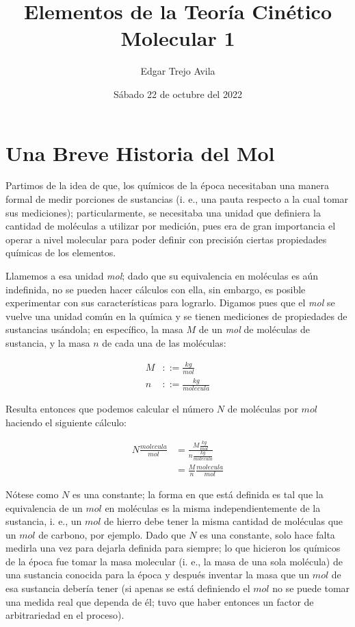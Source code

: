 \documentclass{article}
\title{Elementos de la Teoría Cinético Molecular 1}
\author{Edgar Trejo Avila}
\date{Sábado 22 de octubre del 2022}
\begin{document}
\maketitle

\section*{Una Breve Historia del Mol}

Partimos de la idea de que, los químicos de la época
necesitaban una manera formal de medir porciones de sustancias
(i. e., una pauta respecto a la cual tomar sus mediciones);
particularmente, se necesitaba una unidad que definiera
la cantidad de moléculas a utilizar por medición, pues era 
de gran importancia el operar a nivel molecular para poder 
definir con precisión ciertas propiedades químicas de los elementos.

Llamemos a esa unidad \textit{mol}; dado que su equivalencia
en moléculas es aún indefinida, no se pueden hacer cálculos con
ella, sin embargo, es posible experimentar con sus características
para lograrlo. Digamos pues que el \textit{mol} se vuelve una
unidad común en la química y se tienen mediciones de propiedades
de sustancias usándola; en específico, la masa \(M\) de un \textit{mol}
de moléculas de sustancia, y la masa \(n\) de cada una de las moléculas:

\begin{align*}
    M &::= \frac{kg}{mol}\\
    n &::= \frac{kg}{molecula}
\end{align*}

Resulta entonces que podemos calcular el número \(N\) de moléculas por
\(mol\) haciendo el siguiente cálculo:

\begin{align*}
    N \frac{molecula}{mol} &= \frac{M \frac{kg}{mol}}{n \frac{kg}{molecula}}\\
    &= \frac{M}{n} \frac{molecula}{mol}
\end{align*}

Nótese como \(N\) es una constante; la forma en que está definida
es tal que la equivalencia de un \(mol\) en moléculas es la misma
independientemente de la sustancia, i. e., un \(mol\) de hierro 
debe tener la misma cantidad de moléculas que un \(mol\) de carbono,
por ejemplo. Dado que \(N\) es una constante, solo hace falta medirla
una vez para dejarla definida para siempre; lo que hicieron los 
químicos de la época fue tomar la masa molecular (i. e., la masa 
de una sola molécula) de una sustancia conocida para la época y después inventar
la masa que un \(mol\) de esa sustancia debería tener (si apenas se 
está definiendo el \(mol\) no se puede tomar una medida real que 
dependa de él; tuvo que haber entonces un factor de arbitrariedad en
el proceso).
\end{document}
